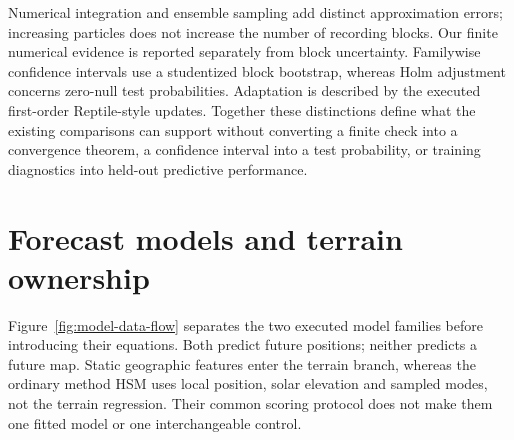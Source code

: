 Numerical integration and ensemble sampling add distinct approximation
errors\cite{kloeden1992}; increasing particles does not increase the number
of recording blocks. Our finite numerical evidence is reported separately
from block uncertainty. Familywise confidence intervals use a studentized
block bootstrap\cite{davison1997}, whereas Holm adjustment concerns
zero-null test probabilities\cite{holm1979}. Adaptation is described by the
executed first-order Reptile-style updates\cite{nichol2018}.
Together these distinctions define what the existing comparisons can
support without converting a finite check into a convergence theorem,
a confidence interval into a test probability, or training diagnostics
into held-out predictive performance.


\section{Forecast models and terrain ownership}
\label{sec:models}\hypertarget{sec:models}{}
Figure~\ref{fig:model-data-flow} separates the two executed model families
before introducing their equations. Both predict future positions; neither
predicts a future map. Static geographic features enter the terrain branch,
whereas the ordinary method HSM uses local position, solar elevation and
sampled modes, not the terrain regression. Their common scoring protocol
does not make them one fitted model or one interchangeable control.
